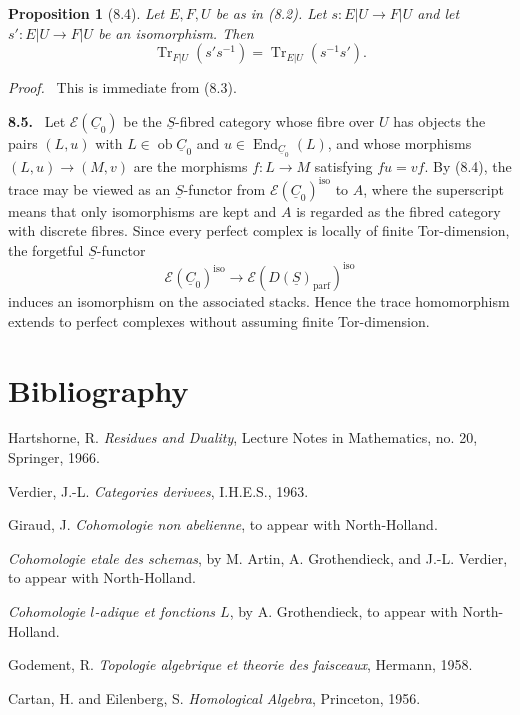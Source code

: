 \documentclass[13pt]{extarticle}
\newcommand{\uS}{\underline S}
\newcommand{\uC}{\underline C}
\newcommand{\Tr}{\operatorname{Tr}}
\newcommand{\ob}{\operatorname{ob}}
\newcommand{\End}{\operatorname{End}}
\newenvironment{statement}[1]{\par\medskip\noindent\textbf{#1.}\ }{\par\medskip}
\newenvironment{prooftext}[1][Proof]{\par\noindent\emph{#1.}\ }{\par\medskip}
\newtheorem*{proposition*}{Proposition}
\begin{document}
\begin{proposition*}[8.4]
Let $E,F,U$ be as in (8.2). Let $s:E|U\to F|U$ and let $s':E|U\to F|U$ be an isomorphism. Then
\[
\Tr_{F|U}(s's^{-1})=
\Tr_{E|U}(s^{-1}s').
\]
\end{proposition*}

\begin{prooftext}
This is immediate from (8.3).
\end{prooftext}

\begin{statement}{8.5}
Let $\mathcal E(\uC_0)$ be the $\uS$-fibred category whose fibre over $U$ has objects the pairs $(L,u)$ with $L\in\ob\uC_0$ and $u\in\End_{\uC_0}(L)$, and whose morphisms $(L,u)\to(M,v)$ are the morphisms $f:L\to M$ satisfying $fu=vf$. By (8.4), the trace may be viewed as an $\uS$-functor from $\mathcal E(\uC_0)^{\mathrm{iso}}$ to $A$, where the superscript means that only isomorphisms are kept and $A$ is regarded as the fibred category with discrete fibres. Since every perfect complex is locally of finite Tor-dimension, the forgetful $\uS$-functor
\[
\mathcal E(\uC_0)^{\mathrm{iso}}
\longrightarrow
\mathcal E(D(\uS)_{\mathrm{parf}})^{\mathrm{iso}}
\]
induces an isomorphism on the associated stacks. Hence the trace homomorphism extends to perfect complexes without assuming finite Tor-dimension.
\end{statement}

\section*{Bibliography}
\begin{enumerate}[label={[\Alph*]}]
\item Hartshorne, R. \emph{Residues and Duality}, Lecture Notes in Mathematics, no. 20, Springer, 1966.
\item Verdier, J.-L. \emph{Categories derivees}, I.H.E.S., 1963.
\item Giraud, J. \emph{Cohomologie non abelienne}, to appear with North-Holland.
\item \emph{Cohomologie etale des schemas}, by M. Artin, A. Grothendieck, and J.-L. Verdier, to appear with North-Holland.
\item \emph{Cohomologie $l$-adique et fonctions $L$}, by A. Grothendieck, to appear with North-Holland.
\item Godement, R. \emph{Topologie algebrique et theorie des faisceaux}, Hermann, 1958.
\item Cartan, H. and Eilenberg, S. \emph{Homological Algebra}, Princeton, 1956.
\end{enumerate}
\end{document}
